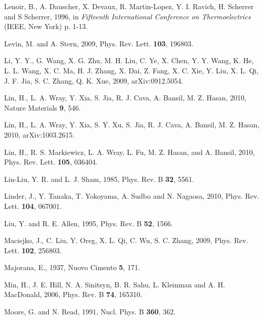 \documentclass[twocolumn,floatfix,showpacs,rmp,aps]{revtex4}
\begin{document}
\begin{thebibliography}{99}
		Lenoir, B., A. Dauscher, X. Devaux, R. Martin-Lopez, Y. I. Ravich,
		H. Scherrer and S Scherrer, 1996, in
		{\it Fifteenth International Conference on Thermoelectrics}
		(IEEE, New York) p. 1-13.
		
		Levin, M. and A. Stern, 2009,
		Phys. Rev. Lett. {\bf 103}, 196803.
		
		Li, Y. Y., G. Wang, X. G.  Zhu, M. H. Liu, C. Ye, X. Chen, Y. Y. Wang,
		K. He, L. L. Wang, X. C. Ma, H. J. Zhang, X. Dai, Z. Fang, X. C. Xie,
		Y. Liu, X. L. Qi, J. F. Jia, S. C. Zhang, Q. K. Xue, 2009,
		arXiv:0912.5054.
		
		Lin, H., L. A. Wray, Y. Xia, S. Jia, R. J. Cava, A. Bansil, M. Z. Hasan, 2010,
		Nature Materials {\bf 9}, 546.
		
		Lin, H., L. A. Wray, Y. Xia, S. Y. Xu, S. Jia, R. J. Cava, A. Bansil, M. Z. Hasan, 2010,
		arXiv:1003.2615.
		
		Lin, H., R. S. Markiewicz, L. A. Wray, L. Fu, M. Z. Hasan, and A. Bansil, 2010,
		Phys. Rev. Lett. {\bf 105}, 036404.
		
		Lin-Liu, Y. R. and L. J. Sham, 1985,
		Phys. Rev. B {\bf 32}, 5561.
		
		Linder, J., Y. Tanaka, T. Yokoyama, A. Sudbo and N. Nagaosa, 2010,
		Phys. Rev. Lett. {\bf 104}, 067001.
		
		Liu, Y. and R. E. Allen, 1995,
		Phys. Rev. B {\bf 52}, 1566.
		
		Maciejko, J., C. Liu, Y. Oreg, X. L. Qi, C. Wu, S. C. Zhang, 2009,
		Phys. Rev. Lett. {\bf 102}, 256803.
		
		Majorana, E., 1937,
		Nuovo Cimento {\bf 5}, 171.
		
		Min, H., J. E. Hill, N. A. Sinitsyn, B. R. Sahu, L. Kleinman and A. H.
		MacDonald, 2006,
		Phys. Rev. B {\bf 74}, 165310.
		
		Moore, G. and N. Read, 1991,
		Nucl. Phys. B {\bf 360}, 362.
		

\end{thebibliography}
\end{document}
